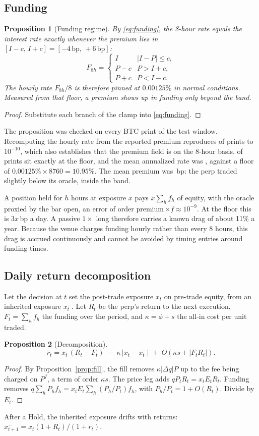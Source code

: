 \documentclass[11pt]{article}
\newtheorem{proposition}{Proposition}
\theoremstyle{remark}
\begin{document}
\subsection{Funding}
\begin{proposition}[Funding regime]\label{prop:funding}
By \eqref{eq:funding}, the 8-hour rate equals the interest rate exactly whenever the premium lies in $[I-c,\,I+c] = [-4\,\text{bp},\,+6\,\text{bp}]$:
\[
F_{8h} = \begin{cases} I & |I-P|\le c,\\ P - c & P > I + c,\\ P + c & P < I - c.\end{cases}
\]
The hourly rate $F_{8h}/8$ is therefore pinned at $0.00125\%$ in normal conditions. Measured from that floor, a premium shows up in funding only beyond the band.
\end{proposition}
\begin{proof}
Substitute each branch of the clamp into \eqref{eq:funding}.
\end{proof}

The proposition was checked on every BTC print of the test window. Recomputing the hourly rate from the reported premium reproduces \FundMatch{} of \FundPrints{} prints to $10^{-10}$, which also establishes that the premium field is on the 8-hour basis. \FundBase{} of prints sit exactly at the floor, and the mean annualized rate was \FundAnn{}, against a floor of $0.00125\%\times 8760 = 10.95\%$. The mean premium was \PremBp{}\,bp: the perp traded slightly below its oracle, inside the band.

A position held for $h$ hours at exposure $x$ pays $x\sum_h f_h$ of equity, with the oracle proxied by the bar open, an error of order premium\,$\times f \approx 10^{-9}$. At the floor this is $3x$\,bp a day. A passive $1\times$ long therefore carries a known drag of about 11\% a year. Because the venue charges funding hourly rather than every 8 hours, this drag is accrued continuously and cannot be avoided by timing entries around funding times.

\subsection{Daily return decomposition}
Let the decision at $t$ set the post-trade exposure $x_t$ on pre-trade equity, from an inherited exposure $x_t^-$. Let $R_t$ be the perp's return to the next execution, $F_t = \sum_h f_h$ the funding over the period, and $\kappa=\phi+s$ the all-in cost per unit traded.
\begin{proposition}[Decomposition]\label{prop:decomp}
\[
r_t = x_t\,(R_t - F_t) \;-\; \kappa\,|x_t - x^-_t| \;+\; O\!\left(\kappa s + |F_t R_t|\right).
\]
\end{proposition}
\begin{proof}
By Proposition~\ref{prop:fill}, the fill removes $\kappa|\Delta q|P$ up to the fee being charged on $P^f$, a term of order $\kappa s$. The price leg adds $qP_t R_t = x_t E_t R_t$. Funding removes $q\sum_h P_h f_h = x_tE_t\sum_h (P_h/P_t)f_h$, with $P_h/P_t = 1+O(R_t)$. Divide by $E_t$.
\end{proof}
After a Hold, the inherited exposure drifts with returns: $x^-_{t+1} = x_t(1+R_t)/(1+r_t)$.
\end{document}
